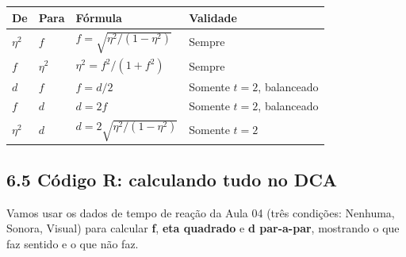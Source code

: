 \documentclass[
]{article}
\newcounter{none} %
\begin{document}
{\def\LTcaptype{none} %
\begin{longtable}[]{@{}
  >{\raggedright\arraybackslash}p{}
  >{\raggedright\arraybackslash}p{}
  >{\raggedright\arraybackslash}p{}
  >{\raggedright\arraybackslash}p{}@{}}
\toprule\noalign{}
\begin{minipage}[b]{\linewidth}\raggedright
De
\end{minipage} & \begin{minipage}[b]{\linewidth}\raggedright
Para
\end{minipage} & \begin{minipage}[b]{\linewidth}\raggedright
Fórmula
\end{minipage} & \begin{minipage}[b]{\linewidth}\raggedright
Validade
\end{minipage} \\
\midrule\noalign{}
\endhead
\bottomrule\noalign{}
\endlastfoot
\(\eta^2\) & \(f\) & \(f = \sqrt{\eta^2 / (1 - \eta^2)}\) & Sempre \\
\(f\) & \(\eta^2\) & \(\eta^2 = f^2 / (1 + f^2)\) & Sempre \\
\(d\) & \(f\) & \(f = d/2\) & Somente \(t = 2\), balanceado \\
\(f\) & \(d\) & \(d = 2f\) & Somente \(t = 2\), balanceado \\
\(\eta^2\) & \(d\) & \(d = 2\sqrt{\eta^2 / (1 - \eta^2)}\) & Somente
\(t = 2\) \\
\end{longtable}
}

\subsection{6.5 Código R: calculando tudo no
DCA}\label{cuxf3digo-r-calculando-tudo-no-dca}

Vamos usar os dados de tempo de reação da Aula 04 (três condições:
Nenhuma, Sonora, Visual) para calcular \textbf{f}, \textbf{eta quadrado}
e \textbf{d par-a-par}, mostrando o que faz sentido e o que não faz.
\end{document}
